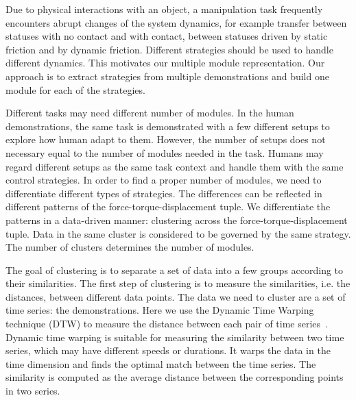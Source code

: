Due to physical interactions with an object, a manipulation task
frequently encounters abrupt changes of the system dynamics, for
example transfer between statuses with no contact and with contact,
between statuses driven by static friction and by
dynamic friction. Different strategies should be used to handle
different dynamics. This motivates our multiple module
representation. Our approach is to extract strategies from multiple
demonstrations and build one module for each of the
strategies. %


Different tasks may need different number of modules. In the human
demonstrations, the same task is demonstrated with a few different
setups to explore how human adapt to them. However, the number of
setups does not necessary equal to the number of modules needed in the
task. Humans may regard different setups as the same task context and
handle them with the same control
strategies. %
In order to find a proper number of modules, we need to differentiate
different types of strategies. The differences can be reflected in
different patterns of the force-torque-displacement tuple. We
differentiate the patterns in a data-driven manner: clustering across
the force-torque-displacement tuple. Data in the same cluster is
considered to be governed by the same strategy. The number of clusters
determines the number of modules.


The goal of clustering is to separate a set of data into a few groups
according to their similarities. The first step of clustering is to
measure the similarities, i.e. the distances, between different data
points. The data we need to cluster are a set of time series: the demonstrations.
Here we
use the Dynamic Time Warping technique (DTW) to measure the distance
between each pair of time series~\citep{berndt1994using}.
Dynamic time warping is suitable for measuring the similarity between
two time series, which may have different speeds or durations. It
warps the data in the time dimension and finds the optimal match
between the time series. The similarity is computed as the average
distance between the corresponding points in two series.

